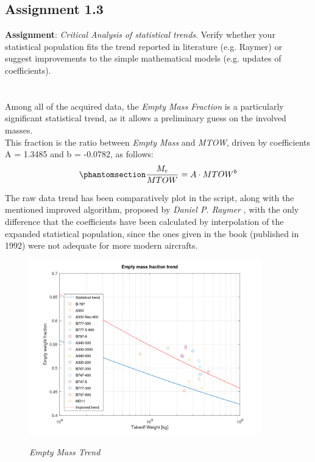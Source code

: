 \documentclass{article}
\begin{document}
\subsection{Assignment 1.3\label{Assignment_1.3}}
\textbf{Assignment}: \textit{Critical Analysis of statistical trends}.
Verify whether your statistical population fits the trend reported in
literature (e.g. Raymer) or suggest improvements to the simple
mathematical models (e.g. updates of coefficients).\\ \\ \\ 

Among all of the acquired data, the \textit{Empty Mass Fraction} is a particularly significant
statistical trend, as it allows a preliminary guess on the involved masses. \\

This fraction is the ratio between \textit{Empty Mass} and \textit{MTOW}, driven by coefficients A = 1.3485
and b = -0.0782, as follows:
\begin{equation}
    \phantomsection
    \label{empty_mass_fraction_equation}
    \frac{M_e}{MTOW} = A\cdot MTOW^{b} 
\end{equation}

The raw data trend has been comparatively plot in the script, along with the mentioned improved algorithm, 
proposed by \textit{Daniel P. Raymer} \autocite{Raymer_Daniel}, with the only difference that
the coefficients have been calculated by interpolation of the expanded statistical population, since
the ones given in the book (published in 1992) were not adequate for more modern aircrafts.

\begin{figure}[h!]
    \centering
    \includegraphics[width=0.9\textwidth]{Sources/Plots_and_Pictures/Empty_mass_trend.png}\\
    \label{Empty_mass_trend}
    \caption{\textit{Empty Mass Trend}}
\end{figure} 
\end{document}

